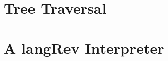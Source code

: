 \documentclass{llncs}
\begin{document}
\section{Tree Traversal}

\section{A {{langRev}} Interpreter}





 

\end{document}
